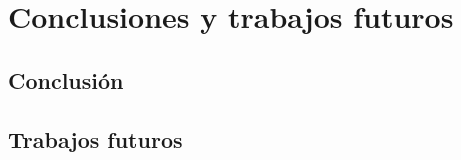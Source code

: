 %
%
%
% 
%
%
%
%

\chapter{Conclusiones y trabajos futuros}
\label{cha:conclusiones-trabajos-futuros}

\section{Conclusión}
\label{sec:conclusion}


\section{Trabajos futuros}
\label{sec:trabajos-futuros}




